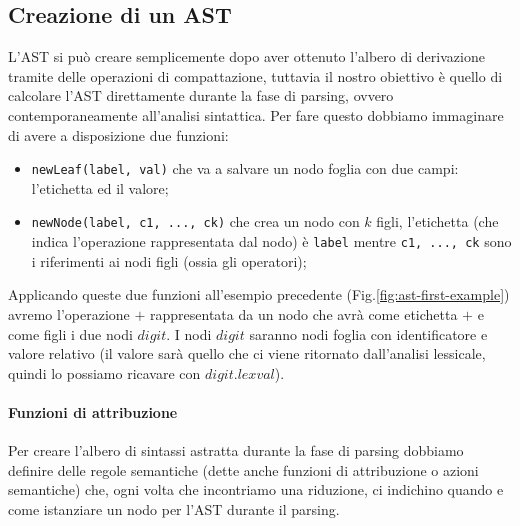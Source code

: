 \documentclass[class=book, crop=false, oneside, 12pt]{standalone}
\begin{document}
\subsection{Creazione di un AST}
L'AST si può creare semplicemente dopo aver ottenuto l'albero di derivazione tramite delle operazioni di compattazione, tuttavia il nostro obiettivo è quello di calcolare l'AST direttamente durante la fase di parsing, ovvero contemporaneamente all'analisi sintattica.
Per fare questo dobbiamo immaginare di avere a disposizione due funzioni:
\begin{itemize}
    \item \texttt{newLeaf(label, val)} che va a salvare un nodo foglia con due campi: l'etichetta ed il valore;
    \item \texttt{newNode(label, c1, ..., ck)} che crea un nodo con \(k\) figli, l'etichetta (che indica l'operazione rappresentata dal nodo) è \texttt{label} mentre \texttt{c1, ..., ck} sono i riferimenti ai nodi figli (ossia gli operatori);
\end{itemize}
Applicando queste due funzioni all'esempio precedente (Fig.\ref{fig:ast-first-example}) avremo l'operazione \(+\) rappresentata da un nodo che avrà come etichetta \(+\) e come figli i due nodi \(digit\).
I nodi \(digit\) saranno nodi foglia con identificatore e valore relativo (il valore sarà quello che ci viene ritornato dall'analisi lessicale, quindi lo possiamo ricavare con \(digit.lexval\)).\\

\paragraph{Funzioni di attribuzione} Per creare l'albero di sintassi astratta durante la fase di parsing dobbiamo definire delle regole semantiche (dette anche funzioni di attribuzione o azioni semantiche) che, ogni volta che incontriamo una riduzione, ci indichino quando e come istanziare un nodo per l'AST durante il parsing.
\end{document}
